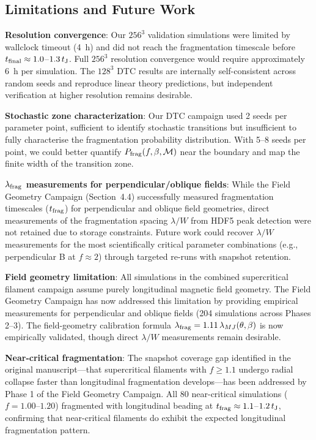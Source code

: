 \documentclass[twoside,twocolumn]{mnras}
\begin{document}
\subsection{Limitations and Future Work}

\textbf{Resolution convergence}: Our $256^3$ validation simulations were limited by wallclock timeout (4~h) and did not reach the fragmentation timescale before $t_{\rm final} \approx 1.0$--$1.3\,t_{\rm J}$. Full $256^3$ resolution convergence would require approximately 6~h per simulation. The $128^3$ DTC results are internally self-consistent across random seeds and reproduce linear theory predictions, but independent verification at higher resolution remains desirable.

\textbf{Stochastic zone characterization}: Our DTC campaign used 2 seeds per parameter point, sufficient to identify stochastic transitions but insufficient to fully characterise the fragmentation probability distribution. With 5--8 seeds per point, we could better quantify $P_{\rm frag}(f, \beta, \mathcal{M})$ near the boundary and map the finite width of the transition zone.

\textbf{$\lambda_{\rm frag}$ measurements for perpendicular/oblique fields}: While the Field Geometry Campaign (Section~4.4) successfully measured fragmentation timescales ($t_{\rm frag}$) for perpendicular and oblique field geometries, direct measurements of the fragmentation spacing $\lambda/W$ from HDF5 peak detection were not retained due to storage constraints. Future work could recover $\lambda/W$ measurements for the most scientifically critical parameter combinations (e.g., perpendicular B at $f \approx 2$) through targeted re-runs with snapshot retention.

\textbf{Field geometry limitation}: All simulations in the combined supercritical filament campaign assume purely longitudinal magnetic field geometry. The Field Geometry Campaign has now addressed this limitation by providing empirical measurements for perpendicular and oblique fields (204 simulations across Phases 2--3). The field-geometry calibration formula $\lambda_{\rm frag} = 1.11\,\lambda_{MJ}(\theta, \beta)$ is now empirically validated, though direct $\lambda/W$ measurements remain desirable.

\textbf{Near-critical fragmentation}: The snapshot coverage gap identified in the original manuscript---that supercritical filaments with $f \geq 1.1$ undergo radial collapse faster than longitudinal fragmentation develops---has been addressed by Phase 1 of the Field Geometry Campaign. All 80 near-critical simulations ($f = 1.00$--$1.20$) fragmented with longitudinal beading at $t_{\rm frag} \approx 1.1$--$1.2\,t_{\rm J}$, confirming that near-critical filaments do exhibit the expected longitudinal fragmentation pattern.
\end{document}
